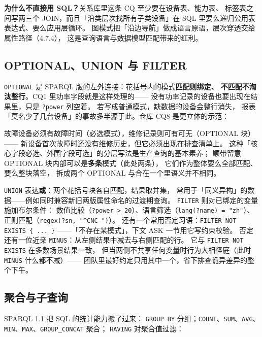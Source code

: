 \begin{noteblock}
\textbf{为什么不直接用 SQL？}关系库里这条 CQ 至少要在设备表、能力表、
标签表之间写两三个 JOIN，而且「沿类层次找所有子类设备」在 SQL
里要么递归公用表表达式、要么应用层循环。
图模式把「沿边导航」做成语言原语，层次穿透交给属性路径（4.7.4），
这是查询语言与数据模型匹配带来的红利。
\end{noteblock}

\subsection{OPTIONAL、UNION 与 FILTER}

\texttt{OPTIONAL} 是 SPARQL 版的左外连接：花括号内的模式\textbf{匹配则绑定、
不匹配不淘汰整行}。CQ1 里功率字段就是这样处理的——
没有功率记录的设备也要出现在结果里，只是 \texttt{?power} 列空着。
若写成普通模式，缺数据的设备会整行消失，
报表「莫名少了几台设备」的事故多半源于此。仓库 CQ8 是更立体的示范：



故障设备必须有故障时间（必选模式），维修记录则可有可无（OPTIONAL 块）——
新设备首次故障时还没有维修历史，但它必须出现在排查清单上。
这种「核心字段必选、外围字段可选」的分层写法是生产查询的基本素养；
顺带留意 OPTIONAL 块内部可以是\textbf{多条}模式（此处两条），
它们作为整体要么全部匹配、要么整块落空，
拆成两个 OPTIONAL 与合在一个里语义并不相同。

\texttt{UNION} 表达\textbf{或}：两个花括号块各自匹配，结果取并集，
常用于「同义异构」的数据——例如同时兼容新旧两版属性命名的过渡期查询。
\texttt{FILTER} 则对已绑定的变量施加布尔条件：
数值比较（\texttt{?power > 20}）、语言筛选（\texttt{lang(?name) = "zh"}）、
正则匹配（\texttt{regex(?sn, "\^{}CNC-")}）。
还有一个常用否定习语：\texttt{FILTER NOT EXISTS \{ ... \}}
——「不存在某模式」，下文 ASK 一节用它写约束校验。
否定还有一位近亲 \texttt{MINUS}：从左侧结果中减去与右侧匹配的行。
它与 \texttt{FILTER NOT EXISTS} 在多数场景结果一致，
但当两侧不共享任何变量时行为大相径庭（此时 \texttt{MINUS} 什么都不减）——
团队里最好约定只用其中一个，省下排查诡异差异的整个下午。

\subsection{聚合与子查询}

SPARQL 1.1 把 SQL 的统计能力搬了过来：
\texttt{GROUP BY} 分组；\texttt{COUNT}、\texttt{SUM}、\texttt{AVG}、
\texttt{MIN}、\texttt{MAX}、\texttt{GROUP\_CONCAT} 聚合；
\texttt{HAVING} 对聚合值过滤：

